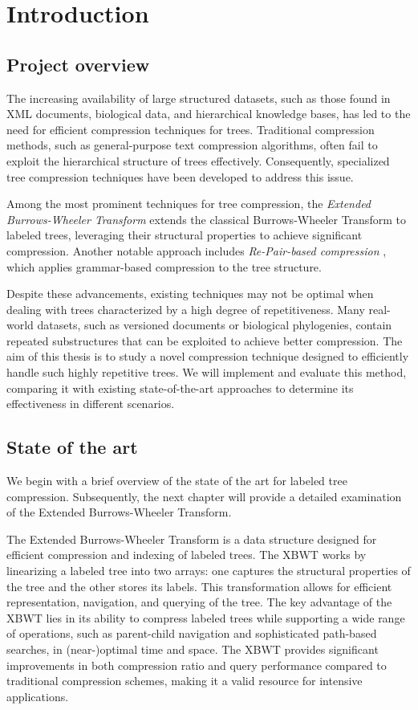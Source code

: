 \chapter{Introduction} \label{chp:introduction}
\section{Project overview}
The increasing availability of large structured datasets, such as those found in XML documents, biological data, and hierarchical knowledge bases, has led to the need for efficient compression techniques for trees. Traditional compression methods, such as general-purpose text compression algorithms, often fail to exploit the hierarchical structure of trees effectively. Consequently, specialized tree compression techniques have been developed to address this issue.

Among the most prominent techniques for tree compression, the \textit{Extended Burrows-Wheeler Transform} \cite{ferragina2009compressing} extends the classical Burrows-Wheeler Transform to labeled trees, leveraging their structural properties to achieve significant compression. Another notable approach includes \textit{Re-Pair-based compression} \cite{lohrey2011tree}, which applies grammar-based compression to the tree structure. 

Despite these advancements, existing techniques may not be optimal when dealing with trees characterized by a high degree of repetitiveness. Many real-world datasets, such as versioned documents or biological phylogenies, contain repeated substructures that can be exploited to achieve better compression. The aim of this thesis is to study a novel compression technique designed to efficiently handle such highly repetitive trees. We will implement and evaluate this method, comparing it with existing state-of-the-art approaches to determine its effectiveness in different scenarios.

\section{State of the art}
We begin with a brief overview of the state of the art for labeled tree compression. Subsequently, the next chapter will provide a detailed examination of the Extended Burrows-Wheeler Transform.

The Extended Burrows-Wheeler Transform \cite{ferragina2009compressing} is a data structure designed for efficient compression and indexing of labeled trees.
The XBWT works by linearizing a labeled tree into two arrays: one captures the structural properties of the tree and the other stores its labels. This transformation allows for efficient representation, navigation, and querying of the tree. The key advantage of the XBWT lies in its ability to compress labeled trees while supporting a wide range of operations, such as parent-child navigation and sophisticated path-based searches, in (near-)optimal time and space.
The XBWT provides significant improvements in both compression ratio and query performance compared to traditional compression schemes, making it a valid resource for intensive applications.

